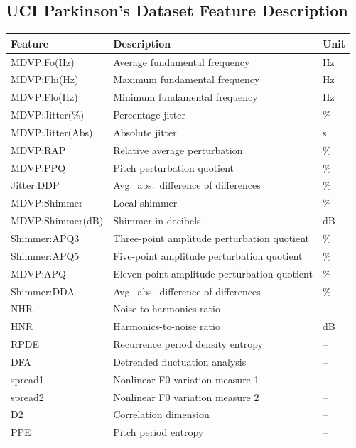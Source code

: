 \documentclass[oneside,a4paper,12pt]{report}
\begin{document}
\begin{appendices}

\chapter{UCI Parkinson's Dataset Feature Description}
\begin{longtable}{|l|p{8.5cm}|l|}
\hline
\textbf{Feature} & \textbf{Description} & \textbf{Unit} \\ \hline
\endhead
MDVP:Fo(Hz) & Average fundamental frequency & Hz \\ \hline
MDVP:Fhi(Hz) & Maximum fundamental frequency & Hz \\ \hline
MDVP:Flo(Hz) & Minimum fundamental frequency & Hz \\ \hline
MDVP:Jitter(\%) & Percentage jitter & \% \\ \hline
MDVP:Jitter(Abs) & Absolute jitter & s \\ \hline
MDVP:RAP & Relative average perturbation & \% \\ \hline
MDVP:PPQ & Pitch perturbation quotient & \% \\ \hline
Jitter:DDP & Avg.\ abs.\ difference of differences & \% \\ \hline
MDVP:Shimmer & Local shimmer & \% \\ \hline
MDVP:Shimmer(dB) & Shimmer in decibels & dB \\ \hline
Shimmer:APQ3 & Three-point amplitude perturbation quotient & \% \\ \hline
Shimmer:APQ5 & Five-point amplitude perturbation quotient & \% \\ \hline
MDVP:APQ & Eleven-point amplitude perturbation quotient & \% \\ \hline
Shimmer:DDA & Avg.\ abs.\ difference of differences & \% \\ \hline
NHR & Noise-to-harmonics ratio & -- \\ \hline
HNR & Harmonics-to-noise ratio & dB \\ \hline
RPDE & Recurrence period density entropy & -- \\ \hline
DFA & Detrended fluctuation analysis & -- \\ \hline
spread1 & Nonlinear F0 variation measure 1 & -- \\ \hline
spread2 & Nonlinear F0 variation measure 2 & -- \\ \hline
D2 & Correlation dimension & -- \\ \hline
PPE & Pitch period entropy & -- \\ \hline
\end{longtable}


\end{appendices}
\end{document}
